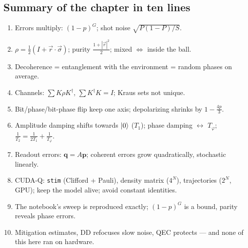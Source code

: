 \documentclass[11pt,a4paper,openany]{book}
\begin{document}
\subsection*{Summary of the chapter in ten lines}
\begin{enumerate}[itemsep=1pt]
\item Errors multiply: $(1-p)^G$; shot noise $\sqrt{P(1-P)/S}$.
\item $\rho = \frac12(I + \vec r\cdot\vec\sigma)$; purity $\frac{1 + |\vec r|^2}{2}$; mixed $\Leftrightarrow$ inside the ball.
\item Decoherence = entanglement with the environment = random phases on average.
\item Channels: $\sum K\rho K^\dagger$, $\sum K^\dagger K = I$; Kraus sets not unique.
\item Bit/phase/bit-phase flip keep one axis; depolarizing shrinks by $1 - \frac{4p}{3}$.
\item Amplitude damping shifts towards $\ket0$ ($T_1$); phase damping $\leftrightarrow$ $T_\varphi$; $\frac1{T_2} = \frac1{2T_1} + \frac1{T_\varphi}$.
\item Readout errors: $\mathbf q = A\mathbf p$; coherent errors grow quadratically, stochastic linearly.
\item CUDA-Q: \texttt{stim} (Clifford + Pauli), density matrix ($4^N$), trajectories ($2^N$, GPU); keep the model alive; avoid constant identities.
\item The notebook's sweep is reproduced exactly; $(1-p)^G$ is a bound, parity reveals phase errors.
\item Mitigation estimates, DD refocuses slow noise, QEC protects --- and none of this here ran on hardware.
\end{enumerate}
\end{document}
